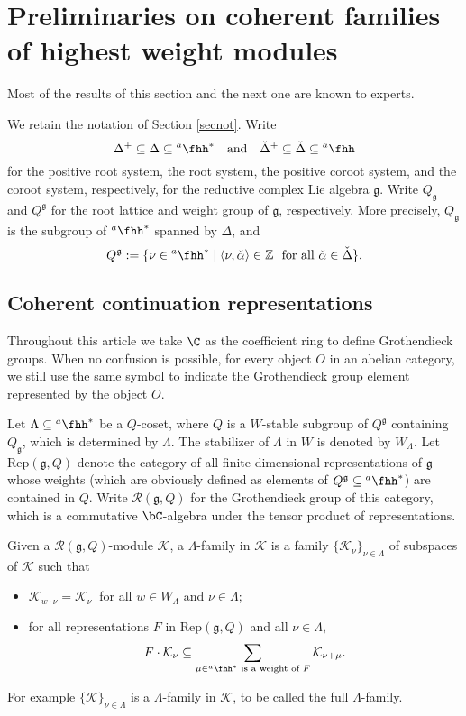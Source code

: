 \documentclass[12pt,a4paper]{amsart}
\def\subset{\subseteq}
\newcommand{\CK}{{\mathcal {K}}}
\newcommand{\g}{\mathfrak g}
\newcommand{\Z}{\mathbb{Z}}
\numberwithin{equation}{section}
\theoremstyle{remark}
\def\hha{{}^a\fhh}
\begin{document}
\section{Preliminaries  on coherent families of highest weight modules}



Most of the results of this section and the next one are known to experts.%

We retain the notation of Section \ref{secnot}.
Write \[
\Delta^+\subset \Delta\subset \hha^*\quad \textrm{and}\quad \check \Delta^+\subset \check \Delta\subset \hha
\]
for the positive root system, the root system, the positive coroot system, and the coroot system, respectively, for the reductive complex Lie algebra $\g$.
Write $Q_\g$ and $ Q^\g$ for the root lattice and weight group of $\g$, respectively. More precisely, $Q_\g$ is the subgroup of $\hha^*$   spanned by $\Delta$, and
\[
Q^\g:=\{\nu\in \hha^*\mid \langle \nu, \check \alpha\rangle \in \Z\ \textrm{ for all }\check \alpha\in \check \Delta\}.
\]


\subsection{Coherent continuation representations}


 Throughout this article we take $\C$ as the coefficient ring to define  Grothendieck groups. When no confusion is possible, for every object $O$ in an abelian category, we  still use the same symbol to indicate the Grothendieck group element represented by the object $O$.




 Let $\Lambda\subset \hha^*$ be a $Q$-coset, where $Q$ is a $W$-stable subgroup of $Q^\g$ containing $Q_\g$, which is determined by $\Lambda$.
The stabilizer of $\Lambda$ in $W$ is denoted by $W_\Lambda$. Let $\mathrm{Rep}(\g, Q)$ denote the category of all finite-dimensional
representations of $\g$ whose weights (which are obviously defined as elements of $Q^\g\subset \hha^*$) are contained in $Q$. Write $\mathcal R(\g, Q)$ for the Grothendieck group of this category, which is
 a commutative $\bC$-algebra under the tensor
product of representations.

 Given  a $\mathcal R(\g, Q)$-module $\CK$, a  $\Lambda$-family in $\CK$ is a family
   $\{\CK_\nu\}_{\nu\in \Lambda}$ of subspaces of $\CK$ such that
\begin{itemize}
\item
  $\CK_{w \cdot \nu}=\CK_\nu\ $  for all $w\in W_\Lambda$ and $\nu\in \Lambda$;
  \item  for all representations $F$ in  $\mathrm{Rep}(\g, Q)$ and all $\nu\in \Lambda$,
  \[
   F\cdot \CK_\nu\subset \sum_{\mu\in \hha^* \textrm{ is a weight of $F$} } \CK_{\nu+\mu}.
  \]
 \end{itemize}
For example $\{\CK\}_{\nu\in \Lambda}$ is a  $\Lambda$-family in $\CK$, to be called the full $\Lambda$-family.
\end{document}
